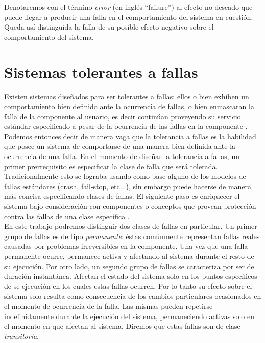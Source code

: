 \documentclass[titlepage, 12pt]{book}
\begin{document}
Denotaremos con el t\'ermino \textit{error} (en ingl\'es ``failure'') al efecto no deseado que puede llegar a producir una falla en el comportamiento del sistema en cuesti\'on. Queda as\'i distinguida la falla de su posible efecto negativo sobre el comportamiento del sistema.






\section{Sistemas tolerantes a fallas}
Existen sistemas dise\~nados para ser tolerantes a fallas: ellos o bien exhiben un comportamiento bien definido ante la ocurrencia de fallas, o bien enmascaran la falla de la componente al usuario, es decir contin\'uan proveyendo su servicio est\'andar especificado a pesar de la ocurrencia de las fallas en la componente \cite{Cristian}. Podemos entonces decir de manera vaga que la tolerancia a fallas es la habilidad que posee un sistema de comportarse de una manera bien definida ante la ocurrencia de una falla. En el momento de dise\~nar la tolerancia a fallas, un primer prerrequisito es especificar la clase de falla que ser\'a tolerada. Tradicionalmente esto se lograba usando como base alguno de los modelos de fallas est\'andares (crash, fail-stop, etc...), sin embargo puede hacerse de manera m\'as concisa especificando clases de fallas. El siguiente paso es enriquecer el sistema bajo consideraci\'on con componentes o conceptos que provean protecci\'on contra las fallas de una clase espec\'ifica \cite{FaultInject}.\\

En este trabajo podremos distinguir dos clases de fallas en particular. Un primer grupo de fallas es de tipo \textit{permanente}: \'estas com\'unmente representan fallas reales causadas por problemas irreversibles en la componente. Una vez que una falla permanente ocurre, permanece activa y afectando al sistema durante el resto de su ejecuci\'on. Por otro lado, un segundo grupo de fallas se caracteriza por ser de duraci\'on instant\'anea. Afectan el estado del sistema solo en los puntos espec\'ificos de se ejecuci\'on en los cuales estas fallas ocurren. Por lo tanto su efecto sobre el sistema solo resulta como consecuencia de los cambios particulares ocasionados en el momento de ocurrencia de la falla. Las mismas pueden repetirse indefinidamente durante la ejecuci\'on del sistema, permaneciendo activas solo en el momento en que afectan al sistema. Diremos que estas fallas son de clase \textit{transitoria}.\\
\end{document}
